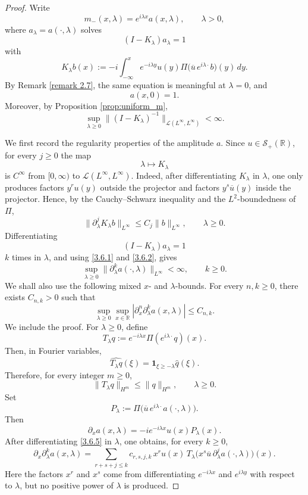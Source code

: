 \documentclass[10pt]{article}
\numberwithin{equation}{section}
\numberwithin{theorem}{section}
\begin{document}
\begin{proof}
Write
\[
m_-(x,\lambda)=e^{i\lambda x}a(x,\lambda),
\qquad \lambda>0,
\]
where \(a_\lambda=a(\cdot,\lambda)\) solves
\[
(I-K_\lambda)a_\lambda=1
\]
with
\[
K_\lambda b(x)
:=
-i\int_{-\infty}^x
e^{-i\lambda y}u(y)
\Pi\bigl(\overline u\,e^{i\lambda\cdot}b\bigr)(y)\,dy .
\]
By Remark \ref{remark 2.7}, the same equation is meaningful at \(\lambda=0\), and
\[
a(x,0)=1.
\]
Moreover, by Proposition \ref{prop:uniform_m},
\begin{equation}
\label{3.6.1}
\sup_{\lambda\ge0}
\|(I-K_\lambda)^{-1}\|_{\mathcal L(L^\infty,L^\infty)}<\infty .
\end{equation}

We first record the regularity properties of the amplitude \(a\). Since
\(u\in\mathcal S_+(\mathbb R)\), for every \(j\ge0\) the map
\[
\lambda\mapsto K_\lambda
\]
is \(C^\infty\) from \([0,\infty)\) to
\(\mathcal L(L^\infty,L^\infty)\). Indeed, after differentiating \(K_\lambda\) in
\(\lambda\), one only produces factors \(y^r u(y)\) outside the projector and factors
\(y^s\overline u(y)\) inside the projector. Hence, by the Cauchy--Schwarz inequality and
the \(L^2\)-boundedness of \(\Pi\),
\begin{equation}
\label{3.6.2}
\|\partial_\lambda^jK_\lambda b\|_{L^\infty}
\le C_j\|b\|_{L^\infty},
\qquad \lambda\ge0 .
\end{equation}
Differentiating
\[
(I-K_\lambda)a_\lambda=1
\]
\(k\) times in \(\lambda\), and using \eqref{3.6.1} and \eqref{3.6.2}, gives
\begin{equation}
\label{3.6.3}
\sup_{\lambda\ge0}
\|\partial_\lambda^k a(\cdot,\lambda)\|_{L^\infty}<\infty,
\qquad k\ge0 .
\end{equation}
We shall also use the following mixed \(x\)- and \(\lambda\)-bounds. For every
\(n,k\ge0\), there exists \(C_{n,k}>0\) such that
\begin{equation}
\label{3.6.4}
\sup_{\lambda\ge0}\sup_{x\in\mathbb R}
|\partial_x^n\partial_\lambda^k a(x,\lambda)|
\le C_{n,k}.
\end{equation}
We include the proof. For \(\lambda\ge0\), define
\[
T_\lambda q
:=
e^{-i\lambda x}\Pi(e^{i\lambda\cdot}q)(x).
\]
Then, in Fourier variables,
\[
\widehat{T_\lambda q}(\xi)
=
\mathbf 1_{\xi\ge-\lambda}\widehat q(\xi).
\]
Therefore, for every integer \(m\ge0\),
\[
\|T_\lambda q\|_{H^m}
\le
\|q\|_{H^m},
\qquad \lambda\ge0.
\]
Set
\[
P_\lambda
:=
\Pi\bigl(\overline u\,e^{i\lambda\cdot}a(\cdot,\lambda)\bigr).
\]
Then
\begin{equation}
\label{3.6.5}
\partial_x a(x,\lambda)
=
-i e^{-i\lambda x}u(x)P_\lambda(x).
\end{equation}
After differentiating \eqref{3.6.5} in \(\lambda\), one obtains, for every \(k\ge0\),
\begin{equation}
\label{3.6.6}
\partial_x\partial_\lambda^k a(x,\lambda)
=
\sum_{r+s+j\le k}
c_{r,s,j,k}\,
x^r u(x)\,
T_\lambda\bigl(x^s\overline u\,\partial_\lambda^j a(\cdot,\lambda)\bigr)(x).
\end{equation}
Here the factors \(x^r\) and \(x^s\) come from differentiating
\(e^{-i\lambda x}\) and \(e^{i\lambda y}\) with respect to \(\lambda\), but no positive
power of \(\lambda\) is produced.


\end{proof}
\end{document}
